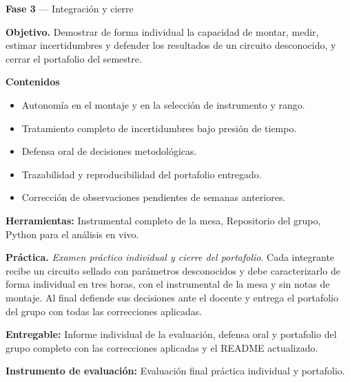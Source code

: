 \documentclass[11pt,a4paper]{article}
\begin{document}
\begin{tcolorbox}[cajaContenido,title={Semana 10 --- Evaluación final práctica y defensa del portafolio}]
\textbf{Fase 3} --- Integración y cierre

\textbf{Objetivo.} Demostrar de forma individual la capacidad de montar, medir, estimar incertidumbres y defender los resultados de un circuito desconocido, y cerrar el portafolio del semestre.

\textbf{Contenidos}

\begin{itemize}[leftmargin=1.4em,itemsep=2pt,topsep=3pt]
  \item Autonomía en el montaje y en la selección de instrumento y rango.
  \item Tratamiento completo de incertidumbres bajo presión de tiempo.
  \item Defensa oral de decisiones metodológicas.
  \item Trazabilidad y reproducibilidad del portafolio entregado.
  \item Corrección de observaciones pendientes de semanas anteriores.
\end{itemize}

\textbf{Herramientas:} Instrumental completo de la mesa, Repositorio del grupo, Python para el análisis en vivo.

\textbf{Práctica.} \emph{Examen práctico individual y cierre del portafolio}. Cada integrante recibe un circuito sellado con parámetros desconocidos y debe caracterizarlo de forma individual en tres horas, con el instrumental de la mesa y sin notas de montaje. Al final defiende sus decisiones ante el docente y entrega el portafolio del grupo con todas las correcciones aplicadas.

\textbf{Entregable:} Informe individual de la evaluación, defensa oral y portafolio del grupo completo con las correcciones aplicadas y el README actualizado.

\textbf{Instrumento de evaluación:} Evaluación final práctica individual y portafolio.
\end{tcolorbox}
\end{document}
